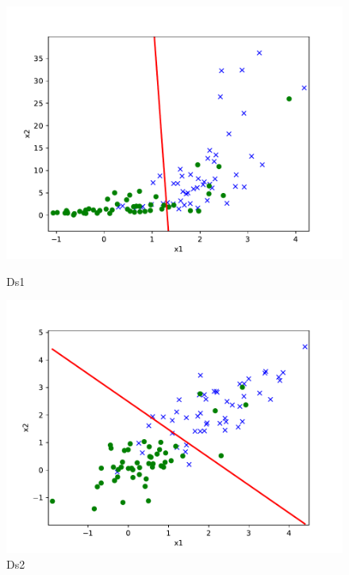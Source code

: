 \begin{answer}
	\begin{figure}[H]
		\centering
		\begin{minipage}[b]{0.46\linewidth}
			\centering
			\includegraphics[width=\linewidth]{ds1_gda.pdf}
			\caption{Ds1}%
			\label{fig:ds1}
		\end{minipage}
		\begin{minipage}[b]{0.46\linewidth}
			\centering
			\includegraphics[width=\linewidth]{ds2_gda.pdf}
			\caption{Ds2}%
			\label{fig:ds2}
		\end{minipage}
	\end{figure}
\end{answer}
